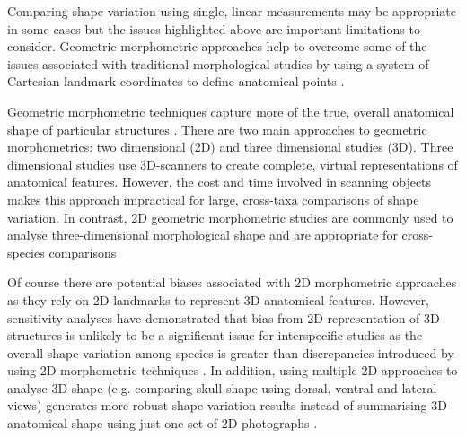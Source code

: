 	Comparing shape variation using single, linear measurements may be appropriate in some cases \citep[e.g.][]{Morales2013} but the issues highlighted above are important limitations to consider. Geometric morphometric approaches help to overcome some of the issues associated with traditional morphological studies by using a system of Cartesian landmark coordinates to define anatomical points \citep{Adams2004}. 
	
	Geometric morphometric techniques capture more of the true, overall anatomical shape of particular structures \citep{Mitteroecker2009}. There are two main approaches to geometric morphometrics: two dimensional (2D) and three dimensional studies (3D). Three dimensional studies use 3D-scanners to create complete, virtual representations of anatomical features. However, the cost and time involved in scanning objects makes this approach impractical for large, cross-taxa comparisons of shape variation. In contrast, 2D geometric morphometric studies are commonly used to analyse three-dimensional morphological shape and are appropriate for cross-species comparisons \citep[e.g.][]{Muschick2012, Panchetti2008, Wroe2007, Marcus2000}  
		
	Of course there are potential biases associated with 2D morphometric approaches as they rely on 2D landmarks to represent 3D anatomical features. However, sensitivity analyses have demonstrated that bias from 2D representation of 3D structures is unlikely to be a significant issue for interspecific studies as the overall shape variation among species is greater than discrepancies introduced by using 2D morphometric techniques \citep{Cardini2014}. In addition, using multiple 2D approaches to analyse 3D shape (e.g. comparing skull shape using dorsal, ventral and lateral views) generates more robust shape variation results instead of summarising 3D anatomical shape using just one set of 2D photographs \citep{Arnqvist1998}.
	

